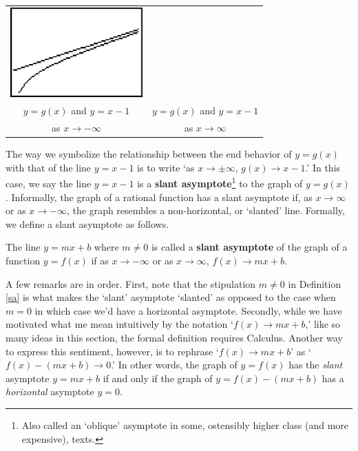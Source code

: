 \begin{center}
\begin{tabular}{cc}
  \includegraphics[width=2in]{./RationalsGraphics/SA02.jpg} \\
  
   $y= g(x)$ and $y=x-1$ & \hspace{0.75in} $y = g(x)$ and $y=x-1$ \\
    as $x \rightarrow -\infty$ & \hspace{0.75in} as $x \rightarrow \infty$ \\

\end{tabular}

\end{center}

The way we symbolize the relationship between the end behavior of $y=g(x)$ with that of the line $y=x-1$ is to write `as $x \rightarrow \pm \infty$, $g(x) \rightarrow x-1$.'  In this case, we say the line $y=x-1$ is a    \textbf{slant asymptote}\footnote{Also called an `oblique' asymptote in some, ostensibly higher class (and more expensive), texts.}  to the graph of $y=g(x)$.  Informally, the graph of a rational function has a slant asymptote if, as $x \rightarrow \infty$ or as $x \rightarrow -\infty$, the graph resembles a non-horizontal, or `slanted' line.  Formally, we define a slant asymptote as follows.


\medskip


\colorbox{ResultColor}{\bbm

\begin{defn} \label{sa} The line $y = mx+b$ where $m \neq 0$  is called a \textbf{slant asymptote} of the graph of a function $y=f(x)$ if as $x \rightarrow -\infty$ or as $x \rightarrow \infty$, $f(x)  \rightarrow mx+b$.


\end{defn}
\ebm}

\medskip


A few remarks are in order.  First, note that the stipulation $m \neq 0$ in Definition \ref{sa} is what makes the `slant' asymptote `slanted' as opposed to the case when $m=0$ in which case we'd have a horizontal asymptote.  Secondly, while we have motivated what me mean intuitively by the notation `$f(x)  \rightarrow mx+b$,' like so many ideas in this section, the formal definition requires Calculus.  Another way to express this sentiment, however, is to rephrase `$f(x)  \rightarrow mx+b$' as `$f(x) - (mx+b) \rightarrow 0$.'  In other words, the graph of $y=f(x)$ has the \textit{slant} asymptote $y = mx+b$ if and only if the graph of $y = f(x) - (mx+b)$ has a \textit{horizontal} asymptote $y=0$.


